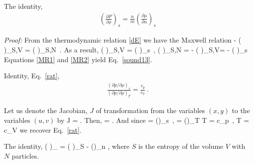 The identity, 
\begin{align}\label{sound13}
\left(\frac{\partial P}{\partial \rho} \right)_{s} =\frac{n}{m} \left(\frac{\partial \mu}{\partial n} \right)_{s}
\end{align}

\noindent
{\it Proof:}
From the thermodynamic relation \eqref{dE} we have the Maxwell relation 
\be\label{MR1}
- \left( \right)_{S,V} = \left( \right)_{S,N}\, .
\ee
As a result,
 \be\label{MR2}
 \left( \right)_{S,V} = \left( \right)_{s}\, ,\quad
{} \left( \right)_{S,N} = - \left( \right)_{S,V}=
 - \left( \right)_{s}
\ee
Equations \eqref{MR1} and \eqref{MR2} yield Eq.~\eqref{sound13}.



Identity, Eq.~\eqref{rat},
\begin{align*}
\frac{(\partial p / \partial \rho)_s }{(\partial p / \partial \rho)_T } = \frac{c_p}{c_V}\, .
\end{align*}


Let us denote the Jacobian, $J$ of transformation from the variables $(x,y)$ to the variables $(u,v)$ by 
\be
J = .
\ee
Then,
\be
{} =     .
\ee
And since
\be
{} = \left(\right)_s\, , \quad {} = \left(\right)_T
\ee
\be
T  = c_p\, , \quad T  = c_V
\ee
we recover Eq.~\eqref{rat}.



The identity,
\be\label{id43}
\left( \right)_{\varepsilon} = \left( \right)_{S} -  \left(\right)_{n} ,
\ee 
where $S$ is the entropy of the volume $V$ with $N$ particles.

